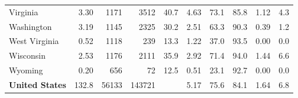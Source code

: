 \begin{tabular}{lrrrrrrrrr}
Virginia & \num{3.30} & \num{1171} & \num{3512} & \num{40.7} & \num{4.63} & \num{73.1} & \num{85.8} & \num{1.12} & \num{4.3} \\
Washington & \num{3.19} & \num{1145} & \num{2325} & \num{30.2} & \num{2.51} & \num{63.3} & \num{90.3} & \num{0.39} & \num{1.2} \\
West Virginia & \num{0.52} & \num{1118} & \num{239} & \num{13.3} & \num{1.22} & \num{37.0} & \num{93.5} & \num{0.00} & \num{0.0} \\
Wisconsin & \num{2.53} & \num{1176} & \num{2111} & \num{35.9} & \num{2.92} & \num{71.4} & \num{94.0} & \num{1.44} & \num{6.6} \\
Wyoming & \num{0.20} & \num{656} & \num{72} & \num{12.5} & \num{0.51} & \num{23.1} & \num{92.7} & \num{0.00} & \num{0.0} \\
\midrule
\textbf{United States} & \num{132.8} & \num{56133} & \num{143721} & & \num{5.17} & \num{75.6} & \num{84.1} & \num{1.64} & \num{6.8} \\
\bottomrule
\end{tabular}
